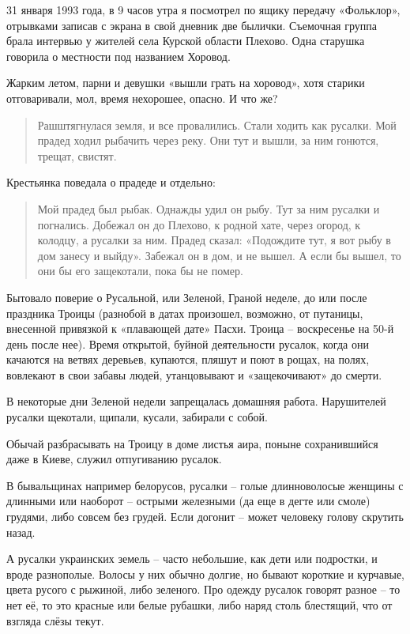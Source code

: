 31 января 1993 года, в 9 часов утра я посмотрел по ящику передачу «Фольклор», отрывками записав с экрана в свой дневник две былички. Съемочная группа брала интервью у жителей села Курской области Плехово. Одна старушка говорила о местности под названием Хоровод. 

Жарким летом, парни и девушки «вышли грать на хоровод», хотя старики отговаривали, мол, время нехорошее, опасно. И что же? 

\begin{quotation} 
Рашштягнулася земля, и все провалились. Стали ходить как русалки. Мой прадед ходил рыбачить через реку. Они тут и вышли, за ним гонются, трещат, свистят.
\end{quotation} 

Крестьянка поведала о прадеде и отдельно:

\begin{quotation} 
Мой прадед был рыбак. Однажды удил он рыбу. Тут за ним русалки и погнались. Добежал он до Плехово, к родной хате, через огород, к колодцу, а русалки за ним. Прадед сказал: «Подождите тут, я вот рыбу в дом занесу и выйду». Забежал он в дом, и не вышел. А если бы вышел, то они бы его защекотали, пока бы не помер.
\end{quotation} 

Бытовало поверие о Русальной, или Зеленой, Граной неделе, до или после праздника Троицы (разнобой в датах произошел, возможно, от путаницы, внесенной привязкой к «плавающей дате» Пасхи. Троица – воскресенье на 50-й день после нее). Время открытой, буйной деятельности русалок, когда они качаются на ветвях деревьев, купаются, пляшут и поют в рощах, на полях, вовлекают в свои забавы людей, утанцовывают и «защекочивают» до смерти.

В некоторые дни Зеленой недели запрещалась домашняя работа. Нарушителей русалки щекотали, щипали, кусали, забирали с собой.

Обычай разбрасывать на Троицу в доме листья аира, поныне сохранившийся даже в Киеве, служил отпугиванию русалок. 

В бывальщинах например белорусов, русалки – голые длинноволосые женщины с длинными или наоборот – острыми железными (да еще в дегте или смоле) грудями, либо совсем без грудей. Если догонит – может человеку голову скрутить назад. 

А русалки украинских земель – часто небольшие, как дети или подростки, и вроде разнополые. Волосы у них обычно долгие, но бывают короткие и курчавые, цвета русого с рыжиной, либо зеленого. Про одежду русалок говорят разное – то нет её, то это красные или белые рубашки, либо наряд столь блестящий, что от взгляда слёзы текут.


